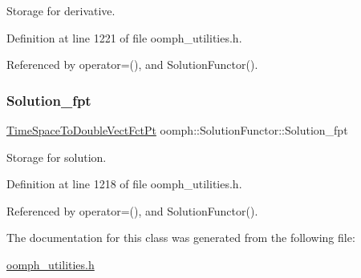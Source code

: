 Storage for derivative. 



Definition at line 1221 of file oomph\+\_\+utilities.\+h.



Referenced by operator=(), and Solution\+Functor().

\mbox{\label{classoomph_1_1SolutionFunctor_ac00dd4dd85c4e9fedc87fdbc15537c42}} 
\subsubsection{\texorpdfstring{Solution\+\_\+fpt}{Solution\_fpt}}
{\footnotesize\ttfamily \hyperlink{classoomph_1_1SolutionFunctorBase_a6df07384ce36c784c7befe7d7bf4a606}{Time\+Space\+To\+Double\+Vect\+Fct\+Pt} oomph\+::\+Solution\+Functor\+::\+Solution\+\_\+fpt}



Storage for solution. 



Definition at line 1218 of file oomph\+\_\+utilities.\+h.



Referenced by operator=(), and Solution\+Functor().



The documentation for this class was generated from the following file\+:\begin{DoxyCompactItemize}
\item 
\hyperlink{oomph__utilities_8h}{oomph\+\_\+utilities.\+h}\end{DoxyCompactItemize}
